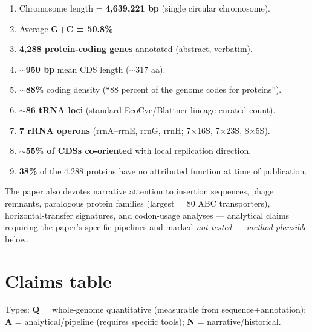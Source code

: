 \documentclass[11pt,letterpaper]{article}
\begin{document}
\begin{enumerate}[nosep, leftmargin=1.2em]
  \item Chromosome length = \textbf{4{,}639{,}221 bp} (single circular chromosome).
  \item Average \textbf{G+C = 50.8\%}.
  \item \textbf{4{,}288 protein-coding genes} annotated (abstract, verbatim).
  \item \textbf{$\sim$950 bp} mean CDS length ($\sim$317 aa).
  \item \textbf{$\sim$88\%} coding density (``88 percent of the genome codes for proteins'').
  \item \textbf{$\sim$86 tRNA loci} (standard EcoCyc/Blattner-lineage curated count).
  \item \textbf{7 rRNA operons} (rrnA--rrnE, rrnG, rrnH; 7$\times$16S, 7$\times$23S, 8$\times$5S).
  \item \textbf{$\sim$55\% of CDSs co-oriented} with local replication direction.
  \item \textbf{38\%} of the 4{,}288 proteins have no attributed function at time of publication.
\end{enumerate}

The paper also devotes narrative attention to insertion sequences, phage remnants, paralogous protein
families (largest = 80 ABC transporters), horizontal-transfer signatures, and codon-usage
analyses --- analytical claims requiring the paper's specific pipelines and marked
\emph{not-tested --- method-plausible} below.

\section{Claims table}

Types: \textbf{Q} = whole-genome quantitative (measurable from sequence+annotation);
\textbf{A} = analytical/pipeline (requires specific tools);
\textbf{N} = narrative/historical.
\end{document}
